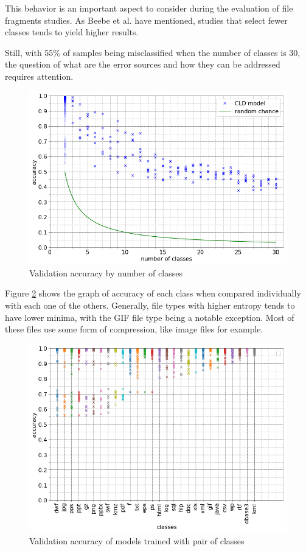This behavior is an important aspect to consider during the evaluation of file fragments studies. As Beebe et al. \cite{beebe_sceadan:_2013} have mentioned, studies that select fewer classes tends to yield higher results. 

Still, with 55\% of samples being misclassified when the number of classes is 30, the question of what are the error sources and how they can be addressed requires attention.

\noindent
\begin{figure}[htb!]
\centering\includegraphics[width=1.0\textwidth]{content/nclasses.png}
\caption{\label{fig:nclasses}Validation accuracy by number of classes}%
\end{figure}


Figure \ref{fig:dual} shows the graph of accuracy of each class when compared individually with each one of the others. Generally, file types with higher entropy tends to have lower minima, with the GIF file type being a notable exception. Most of these files use some form of compression, like image files for example. 


\noindent
\begin{figure}[htb!]
\centering\includegraphics[width=1.0\textwidth]{content/dual.png}
\caption{\label{fig:dual}Validation accuracy of models trained with pair of classes}%
\end{figure}


